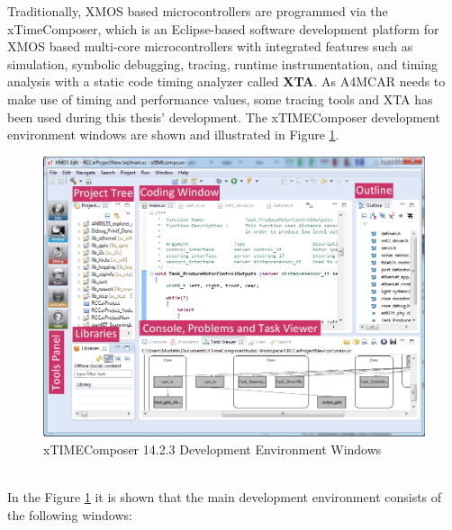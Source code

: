 Traditionally, XMOS based microcontrollers are programmed via the xTimeComposer, which is an Eclipse-based software development platform for XMOS based multi-core microcontrollers with integrated features such as simulation, symbolic debugging, tracing, runtime instrumentation, and timing analysis with a static code timing analyzer called \textbf{XTA}\cite{xmosflyer}. As A4MCAR needs to make use of timing and performance values, some tracing tools and XTA has been used during this thesis' development. The xTIMEComposer development environment windows are shown and illustrated in Figure \ref{fig:xtimecomposerwindows}.
\begin{figure}[!ht]
	\centering
	\captionsetup{justification=centering}
	\includegraphics[scale=0.5]{content/images/xtimecomposerwindows.png}
	\caption{xTIMEComposer 14.2.3 Development Environment Windows}
	\label{fig:xtimecomposerwindows}
\end{figure} \\
In the Figure \ref{fig:xtimecomposerwindows} it is shown that the main development environment consists of the following windows:
